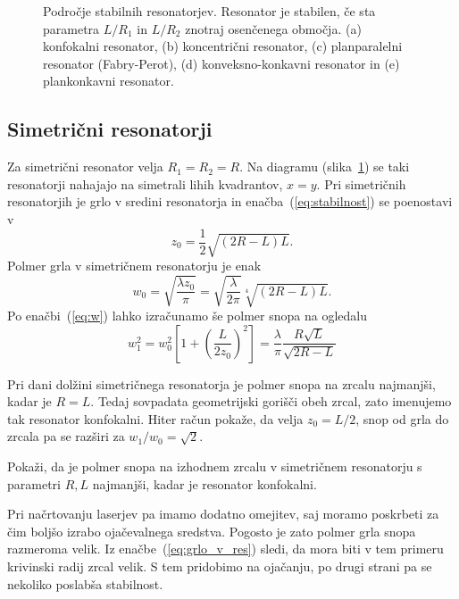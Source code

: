 \begin{figure}[h]
\centering
\def\svgwidth{90truemm} 

\caption{Področje stabilnih resonatorjev. Resonator je stabilen, 
če sta parametra $L/R_{1}$ in $L/R_{2}$ znotraj osenčenega območja. (a) konfokalni resonator,
(b) koncentrični resonator, (c) planparalelni resonator (Fabry-Perot), 
(d) konveksno-konkavni resonator in (e) plankonkavni resonator.}
\label{fig:Podrocje-stabilnih-resonatorjev}
\end{figure}

\subsection*{Simetrični resonatorji}
Za simetrični resonator velja $R_{1}=R_{2}=R$. Na diagramu 
(slika~\ref{fig:Podrocje-stabilnih-resonatorjev}) 
se taki resonatorji nahajajo na simetrali lihih kvadrantov, $x=y$. Pri simetričnih resonatorjih 
je grlo v sredini resonatorja in enačba~(\ref{eq:stabilnost}) se poenostavi v 
\begin{equation}
z_{0}=\frac{1}{2}\sqrt{(2R-L)L}.
\label{eq:zosim}
\end{equation}
Polmer grla v simetričnem resonatorju je enak
\begin{equation}
w_{0}=\sqrt{\frac{\lambda z_{0}}{\pi}}=\sqrt{\frac{\lambda}{2\pi}}\sqrt[4]{(2R-L)L}.
\label{eq:grlo_v_res}
\end{equation}
Po enačbi~(\ref{eq:w}) lahko izračunamo še polmer snopa na ogledalu
\begin{equation}
w_{1}^{2}=w_{0}^{2}\left[1+\left(\frac{L}{2z_{0}}\right)^{2}\right]=
\frac{\lambda}{\pi}\frac{R\sqrt{L}}{\sqrt{2R-L}}
\end{equation}

Pri dani dolžini simetričnega resonatorja je polmer snopa na zrcalu najmanjši,
kadar je $R=L$. Tedaj sovpadata geometrijski gorišči obeh zrcal,
zato imenujemo tak resonator konfokalni. 
Hiter račun pokaže, da velja $z_{0}=L/2$, snop od grla do zrcala pa se razširi
za $w_1/w_0=\sqrt{2}$. 
\begin{definition}
\label{naloga:uklon_konf}
 Pokaži, da je polmer snopa na izhodnem zrcalu v simetričnem resonatorju s parametri $R,L$
 najmanjši, kadar je resonator konfokalni.
\end{definition}

Pri načrtovanju laserjev pa imamo dodatno omejitev, saj moramo poskrbeti za 
čim boljšo izrabo ojačevalnega sredstva. Pogosto je zato 
polmer grla snopa razmeroma velik. Iz enačbe~(\ref{eq:grlo_v_res})
sledi, da mora biti v tem primeru krivinski radij zrcal velik. S tem
pridobimo na ojačanju, po drugi strani pa se nekoliko poslabša stabilnost.

